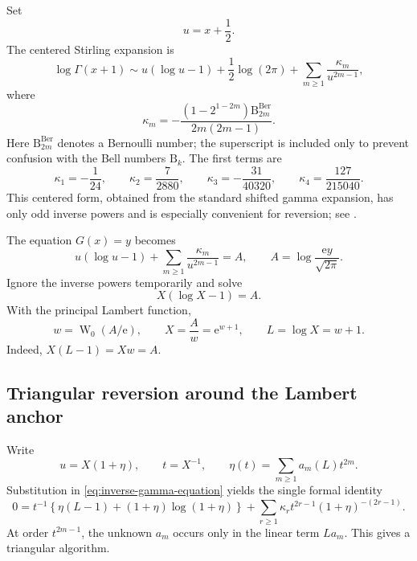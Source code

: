 \documentclass[11pt,oneside]{article}
\theoremstyle{plain}
\theoremstyle{definition}
\theoremstyle{remark}
\newcommand{\ee}{\mathrm{e}}
\newcommand{\W}{\operatorname{W}}
\newcommand{\Bell}{\mathrm{B}}
\begin{document}
Set
\begin{equation}
 u=x+\frac12.
 \label{eq:u-centered}
\end{equation}
The centered Stirling expansion is
\begin{equation}
 \log\Gamma(x+1)
 \sim u(\log u-1)+\frac12\log(2\pi)
 +\sum_{m\ge1}\frac{\kappa_m}{u^{2m-1}},
 \label{eq:centered-Stirling}
\end{equation}
where
\begin{equation}
 \kappa_m=-\frac{(1-2^{1-2m})\Bell^{\mathrm{Ber}}_{2m}}
 {2m(2m-1)}.
 \label{eq:kappa-def}
\end{equation}
Here \(\Bell^{\mathrm{Ber}}_{2m}\) denotes a Bernoulli number; the superscript
is included only to prevent confusion with the Bell numbers \(\Bell_k\).
The first terms are
\begin{equation}
 \kappa_1=-\frac1{24},\qquad
 \kappa_2=\frac7{2880},\qquad
 \kappa_3=-\frac{31}{40320},\qquad
 \kappa_4=\frac{127}{215040}.
 \label{eq:kappa-first}
\end{equation}
This centered form, obtained from the standard shifted gamma expansion, has
only odd inverse powers and is especially convenient for reversion; see
\cite{DLMF5,Olver1997}.

The equation \(G(x)=y\) becomes
\begin{equation}
 u(\log u-1)+\sum_{m\ge1}\frac{\kappa_m}{u^{2m-1}}
 =A,
 \qquad
 A=\log\!\frac{\ee y}{\sqrt{2\pi}}.
 \label{eq:inverse-gamma-equation}
\end{equation}
Ignore the inverse powers temporarily and solve
\begin{equation}
 X(\log X-1)=A.
 \label{eq:X-leading-equation}
\end{equation}
With the principal Lambert function,
\begin{equation}
 w=\W_0(A/\ee),\qquad
 X=\frac{A}{w}=\ee^{w+1},\qquad
 L=\log X=w+1.
 \label{eq:AXwL}
\end{equation}
Indeed, \(X(L-1)=Xw=A\).

\subsection{Triangular reversion around the Lambert anchor}

Write
\begin{equation}
 u=X(1+\eta),\qquad
 t=X^{-1},\qquad
 \eta(t)=\sum_{m\ge1}a_m(L)t^{2m}.
 \label{eq:eta-ansatz}
\end{equation}
Substitution in \eqref{eq:inverse-gamma-equation} yields the single formal
identity
\begin{equation}
 0=t^{-1}\left\{\eta(L-1)+(1+\eta)\log(1+\eta)\right\}
 +\sum_{r\ge1}\kappa_rt^{2r-1}(1+\eta)^{-(2r-1)}.
 \label{eq:eta-master}
\end{equation}
At order \(t^{2m-1}\), the unknown \(a_m\) occurs only in the linear term
\(La_m\).  This gives a triangular algorithm.
\end{document}
